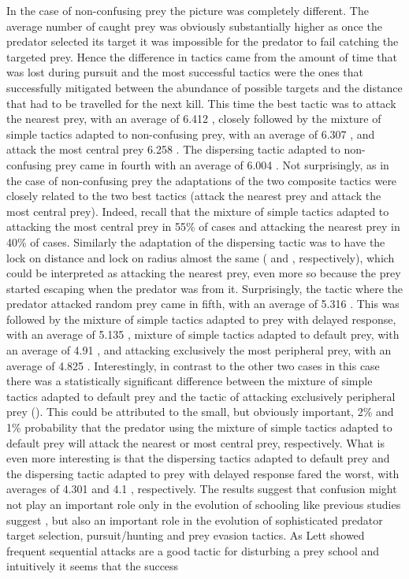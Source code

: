 In the case of non-confusing prey the picture was completely different. The average number of caught prey was obviously substantially higher as once the predator selected its target it was impossible for the predator to fail catching the targeted prey. Hence the difference in tactics came from the amount of time that was lost during pursuit and the most successful tactics were the ones that successfully mitigated between the abundance of possible targets and the distance that had to be travelled for the next kill. This time the best tactic was to attack the nearest prey, with an average of \num{6.412} , closely followed by the mixture of simple tactics adapted to non-confusing prey, with an average of \num{6.307} , and attack the most central prey \num{6.258} . The dispersing tactic adapted to non-confusing prey came in fourth with an average of \num{6.004} . Not surprisingly, as in the case of non-confusing prey the adaptations of the two composite tactics were closely related to the two best tactics (attack the nearest prey and attack the most central prey). Indeed, recall that the mixture of simple tactics adapted to attacking the most central prey in 55\% of cases and attacking the nearest prey in 40\% of cases. Similarly the adaptation of the dispersing tactic was to have the lock on distance and lock on radius almost the same ( and , respectively), which could be interpreted as attacking the nearest prey, even more so because the prey started escaping when the predator was  from it. Surprisingly, the tactic where the predator attacked random prey came in fifth, with an average of \num{5.316} . This was followed by the mixture of simple tactics adapted to prey with delayed response, with an average of \num{5.135} , mixture of simple tactics adapted to default prey, with an average of \num{4.91} , and attacking exclusively the most peripheral prey, with an average of \num{4.825} . Interestingly, in contrast to the other two cases in this case there was a statistically significant difference between the mixture of simple tactics adapted to default prey and the tactic of attacking exclusively peripheral prey (). This could be attributed to the small, but obviously important, 2\% and 1\% probability that the predator using the mixture of simple tactics adapted to default prey will attack the nearest or most central prey, respectively. What is even more interesting is that the dispersing tactics adapted to default prey and the dispersing tactic adapted to prey with delayed response fared the worst, with averages of \num{4.301}  and \num{4.1} , respectively. The results suggest that confusion might not play an important role only in the evolution of schooling like previous studies suggest \cite{kunz2006prey,nishimura2002predator,olson2013predator,zheng2005behavior}, but also an important role in the evolution of sophisticated predator target selection, pursuit/hunting and prey evasion tactics. As Lett\etal \cite{lett2014effects} showed frequent sequential attacks are a good tactic for disturbing a prey school and intuitively it seems that the success 